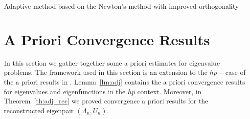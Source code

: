 \documentclass[preprint,12pt]{elsarticle}
\begin{document}
\begin{algorithm}[H] \caption{Adaptive method based on the Newton's method with improved orthogonality} \label{alg:newton_impadapt} 
\begin{algorithmic}



\REPEAT
{}


\end{algorithmic}
\end{algorithm}

\section{A Priori Convergence Results}\label{sse:pcf_priori}\label{sec:aprio}


In this section  we gather together some a priori estimates for eigenvalue
problems.  The framework used in this section is an extension to the $hp-$case of the a priori results in 
\cite{giani1,pcf_apost}. Lemma~\ref{lm:adj} contains the a priori convergence results for eigenvalues and eigenfunctions in the $hp$ context. Moreover, in Theorem~\ref{th:adj_rec} we proved convergence a priori results for the reconstructed eigenpair $(\Lambda_n,U_n)$.
\end{document}
